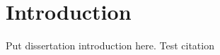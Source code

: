 \chapter*{Introduction} %
Put dissertation introduction here.
Test citation~\cite{dean2011characterization}
